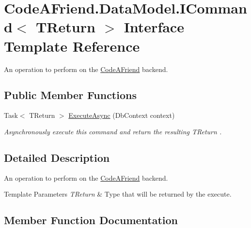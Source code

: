 \hypertarget{interface_code_a_friend_1_1_data_model_1_1_i_command}{}\section{Code\+A\+Friend.\+Data\+Model.\+I\+Command$<$ T\+Return $>$ Interface Template Reference}
\label{interface_code_a_friend_1_1_data_model_1_1_i_command}


An operation to perform on the \mbox{\hyperlink{namespace_code_a_friend}{Code\+A\+Friend}} backend.  


\subsection*{Public Member Functions}
\begin{DoxyCompactItemize}
\item 
Task$<$ T\+Return $>$ \mbox{\hyperlink{interface_code_a_friend_1_1_data_model_1_1_i_command_a203b6d77d611382df2e9a8961a3bccaa}{Execute\+Async}} (Db\+Context context)
\begin{DoxyCompactList}\small\item\em Asynchronously execute this command and return the resulting {\itshape T\+Return} . \end{DoxyCompactList}\end{DoxyCompactItemize}


\subsection{Detailed Description}
An operation to perform on the \mbox{\hyperlink{namespace_code_a_friend}{Code\+A\+Friend}} backend. 


\begin{DoxyTemplParams}{Template Parameters}
{\em T\+Return} & Type that will be returned by the execute.\\
\hline
\end{DoxyTemplParams}


\subsection{Member Function Documentation}
\mbox{\label{interface_code_a_friend_1_1_data_model_1_1_i_command_a203b6d77d611382df2e9a8961a3bccaa}} 
